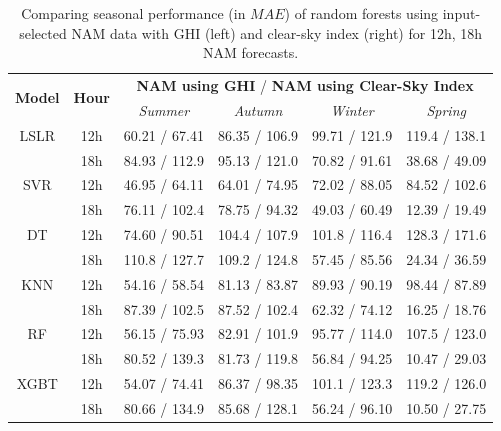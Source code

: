 \begin{table}[htbp]
\begin{center}
\caption[Comparing seasonal performance of random forests using input-selected NAM data with GHI and Clear-Sky Index for 12h, 18h NAM forecasts]{Comparing seasonal performance (in $MAE$) of random forests using input-selected NAM data with GHI (left) and clear-sky index (right) for 12h, 18h NAM forecasts.}
\label{tab:seasonal_comparison}
\begin{tabular}{cccccc}
\toprule
\multirow{2}{*}{\textbf{Model}} & \multirow{2}{*}{\textbf{Hour}} & \multicolumn{4}{c}{\textbf{NAM using GHI} / \textbf{NAM using Clear-Sky Index}}   \\ \cmidrule{3-6} 
& & \textit{Summer} & \textit{Autumn} & \textit{Winter} & \textit{Spring} \\
\midrule
LSLR           & 12h                    & 60.21 / 67.41           & 86.35 / 106.9           & 99.71 / 121.9           & 119.4 / 138.1 \\
               & 18h                    & 84.93 / 112.9          & 95.13 / 121.0           & 70.82 / 91.61           & 38.68 / 49.09 \\
SVR            & 12h                    & 46.95 / 64.11          & 64.01 / 74.95           & 72.02 / 88.05           & 84.52 / 102.6   \\
               & 18h                    & 76.11 / 102.4           & 78.75 / 94.32           & 49.03 / 60.49           & 12.39 / 19.49 \\
DT             & 12h                    & 74.60 / 90.51           & 104.4 / 107.9          & 101.8 / 116.4          & 128.3 / 171.6 \\
               & 18h                    & 110.8 / 127.7          & 109.2 / 124.8           & 57.45 / 85.56           & 24.34 / 36.59 \\
KNN            & 12h                    & 54.16 / 58.54          & 81.13 / 83.87           & 89.93 / 90.19           & 98.44 / 87.89 \\
               & 18h                    & 87.39 / 102.5          & 87.52 / 102.4          & 62.32 / 74.12           & 16.25 / 18.76 \\
RF             & 12h                    & 56.15 / 75.93           & 82.91 / 101.9          & 95.77 / 114.0          & 107.5 / 123.0 \\
               & 18h                    & 80.52 / 139.3           & 81.73 / 119.8           & 56.84 / 94.25          & 10.47 / 29.03 \\
XGBT           & 12h                    & 54.07 / 74.41          & 86.37 / 98.35           & 101.1 / 123.3          & 119.2 / 126.0 \\
               & 18h                    & 80.66 / 134.9          & 85.68 / 128.1           & 56.24 / 96.10          & 10.50 / 27.75 \\ \bottomrule
\end{tabular}
\end{center}
\end{table}

